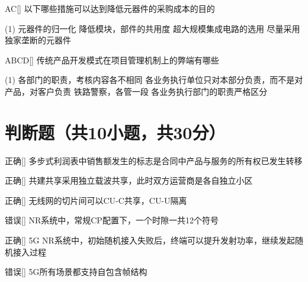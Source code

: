 \begin{choice}{\;AC\;}[]
    以下哪些措施可以达到降低元器件的采购成本的目的
    \begin{tasks}(1)
        \task 元器件的归一化
        \task 降低模块，部件的共用度
        \task 超大规模集成电路的选用
        \task 尽量采用独家垄断的元器件
    \end{tasks}
\end{choice}

\begin{choice}{\;ABCD\;}[]
    传统产品开发模式在项目管理机制上的弊端有哪些
    \begin{tasks}(1)
        \task 各部门的职责，考核内容各不相同
        \task 各业务执行单位只对本部分负责，而不是对产品，对客户负责
        \task 铁路警察，各管一段
        \task 各业务执行部门的职责严格区分
    \end{tasks}
\end{choice}




\section{判断题（共10小题，共30分）}

\begin{choice}{\;正确\;}[]
    多步式利润表中销售额发生的标志是合同中产品与服务的所有权已发生转移
\end{choice}


\begin{choice}{\;正确\;}[]
    共建共享采用独立载波共享，此时双方运营商是各自独立小区
\end{choice}

\begin{choice}{\;正确\;}[]
    无线网的切片间可以CU-C共享，CU-U隔离
\end{choice}

\begin{choice}{\;错误\;}[]
    NR系统中，常规CP配置下，一个时隙一共12个符号
\end{choice}

\begin{choice}{\;正确\;}[]
    5G NR系统中，初始随机接入失败后，终端可以提升发射功率，继续发起随机接入过程
\end{choice}

\begin{choice}{\;错误\;}[]
    5G所有场景都支持自包含帧结构

\end{choice}


